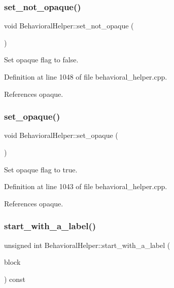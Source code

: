 \subsubsection{\texorpdfstring{set\+\_\+not\+\_\+opaque()}{set\_not\_opaque()}}
{\footnotesize\ttfamily void Behavioral\+Helper\+::set\+\_\+not\+\_\+opaque (\begin{DoxyParamCaption}{ }\end{DoxyParamCaption})}



Set opaque flag to false. 



Definition at line 1048 of file behavioral\+\_\+helper.\+cpp.



References opaque.

\mbox{\label{classBehavioralHelper_acb52613a750173a27607e9575cc92924}} 
\subsubsection{\texorpdfstring{set\+\_\+opaque()}{set\_opaque()}}
{\footnotesize\ttfamily void Behavioral\+Helper\+::set\+\_\+opaque (\begin{DoxyParamCaption}{ }\end{DoxyParamCaption})}



Set opaque flag to true. 



Definition at line 1043 of file behavioral\+\_\+helper.\+cpp.



References opaque.

\mbox{\label{classBehavioralHelper_a2d87c9daa2632ea995500bb7d5c14efd}} 
\subsubsection{\texorpdfstring{start\+\_\+with\+\_\+a\+\_\+label()}{start\_with\_a\_label()}}
{\footnotesize\ttfamily unsigned int Behavioral\+Helper\+::start\+\_\+with\+\_\+a\+\_\+label (\begin{DoxyParamCaption}\item[{const bloc\+Ref \&}]{block }\end{DoxyParamCaption}) const\hspace{0.3cm}{\ttfamily [virtual]}}




